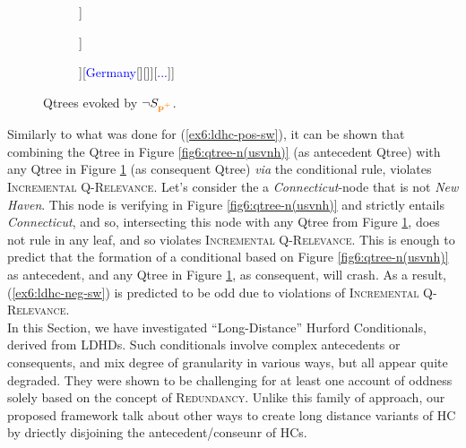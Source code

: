 \begin{figure}[H]
	\centering
	\begin{subfigure}[b]{.35\linewidth}
		\centering
		\begin{forest}
			[CS[{\textcolor{orange}{Connecticut}}][\fbox{\textcolor{orange}{$\neg$Connecticut}}]]
		\end{forest}
	\end{subfigure}	
	\begin{subfigure}[b]{.35\linewidth}
		\centering
		\begin{forest}
			[CS[\textcolor{orange}{Connecticut}][\fbox{\textcolor{orange}{Lower Saxony}}][\fbox{\textcolor{orange}{...}}]]
		\end{forest}
	\end{subfigure}
	\begin{subfigure}[b]{.35\linewidth}
		\centering
		\begin{forest}
			[CS[\textcolor{blue}{US}[\textcolor{orange}{Connecticut}][\fbox{\textcolor{orange}{...}}]][\textcolor{blue}{Germany}[\fbox{\textcolor{orange}{Lower Saxony}}][\fbox{\textcolor{orange}{...}}]][\textcolor{blue}{...}]]
		\end{forest}
	\end{subfigure}	
	\caption[]{Qtrees evoked by $\neg S_{\textbf{\textcolor{orange}{p$^+$}}}$.}\label{fig6:qtrees-nct}
\end{figure}


Similarly to what was done for (\ref{ex6:ldhc-pos-sw}), it can be shown that combining the Qtree in Figure \ref{fig6:qtree-n(usvnh)} (as antecedent Qtree) with any Qtree in Figure \ref{fig6:qtrees-nct} (as consequent Qtree) \textit{via} the conditional rule, violates \textsc{Incremental Q-Relevance}. Let's consider the a \textit{Connecticut}-node that is not \textit{New Haven}. This node is verifying in Figure \ref{fig6:qtree-n(usvnh)} and strictly entails \textit{Connecticut}, and so, intersecting this node with any Qtree from Figure \ref{fig6:qtrees-nct}, does not rule in any leaf, and so violates \textsc{Incremental Q-Relevance}. This is enough to predict that the formation of a conditional based on Figure \ref{fig6:qtree-n(usvnh)} as antecedent, and any Qtree in Figure \ref{fig6:qtrees-nct}, as consequent, will crash. As a result, (\ref{ex6:ldhc-neg-sw}) is predicted to be odd due to violations of \textsc{Incremental Q-Relevance}.\\

In this Section, we have investigated ``Long-Distance'' Hurford Conditionals, derived from LDHDs. Such conditionals involve complex antecedents or consequents, and mix degree of granularity in various ways, but all appear quite degraded. They were shown to be challenging for at least one account of oddness solely based on the concept of \textsc{Redundancy}. Unlike this family of approach, our proposed framework 
talk about other ways to create long distance variants of HC by driectly disjoining the antecedent/conseunr of HCs.

